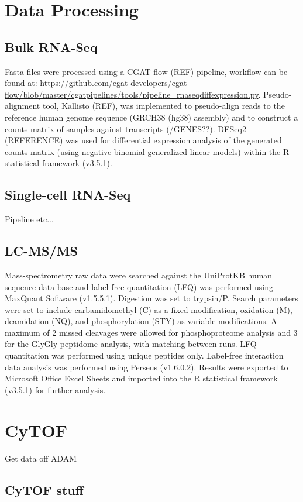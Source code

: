 \section{Data Processing}
\subsection{Bulk RNA-Seq}
Fasta files were processed using a CGAT-flow (REF) pipeline, workflow can be found at: \url{https://github.com/cgat-developers/cgat-flow/blob/master/cgatpipelines/tools/pipeline_rnaseqdiffexpression.py}. Pseudo-alignment tool, Kallisto (REF), was implemented to pseudo-align reads to the reference human genome sequence (GRCH38 (hg38) assembly) and to construct a counts matrix of samples against transcripts (/GENES??). DESeq2 (REFERENCE) was used for differential expression analysis of the generated  counts  matrix  (using  negative  binomial  generalized  linear  models) within the R statistical framework (v3.5.1).

\subsection{Single-cell RNA-Seq}
Pipeline etc...

\subsection{LC-MS/MS}
Mass-spectrometry raw data were searched against the UniProtKB human sequence data base and label-free quantitation (LFQ) was performed using MaxQuant Software (v1.5.5.1). Digestion was set to trypsin/P. Search parameters were set to include carbamidomethyl (C) as a fixed modification, oxidation (M), deamidation (NQ), and phosphorylation (STY) as variable modifications. A maximum of 2 missed cleavages were allowed for phosphoproteome analysis and 3 for the GlyGly peptidome analysis, with matching between runs. LFQ quantitation was performed using unique peptides only. Label-free interaction data analysis was performed using Perseus (v1.6.0.2). Results were exported to Microsoft Office Excel Sheets and imported into the R statistical framework (v3.5.1) for further analysis.


\section{CyTOF}
Get data off ADAM
\subsection{CyTOF stuff}
